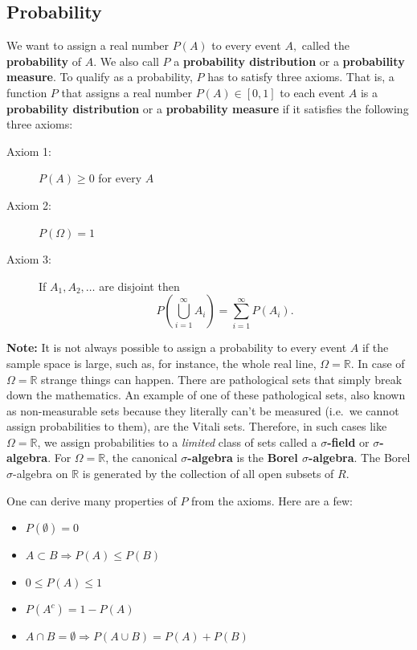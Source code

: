 \documentclass[
  14pt,
]{memoir}
\begin{document}
\hypertarget{probability}{%
\subsection{Probability}\label{probability}}

We want to assign a real number \(P(A)\) to every event \(A,\) called the \textbf{probability} of \(A .\) We also call \(P\) a \textbf{probability distribution} or a \textbf{probability measure}. To qualify as a probability, \(P\) has to satisfy three axioms. That is, a function \(P\) that assigns a real number \(P(A)\in[0,1]\) to each event \(A\) is a \textbf{probability distribution} or a \textbf{probability measure} if it satisfies the following three axioms:
\vspace*{-.25cm}

\begin{description}
\item[Axiom 1:] $P(A) \geq 0$ for every $A$ 
\item[Axiom 2:] $P(\Omega)=1$
\item[Axiom 3:] If $A_{1}, A_{2}, \ldots$ are disjoint then
$$
P\left(\bigcup_{i=1}^{\infty} A_{i}\right)=\sum_{i=1}^{\infty} P\left(A_{i}\right).
$$
\end{description}

\bigskip

\noindent\textbf{Note:} It is not always possible to assign a probability to every event \(A\) if the sample space is large, such as, for instance, the whole real line, \(\Omega=\mathbb{R}\). In case of \(\Omega=\mathbb{R}\) strange things can happen. There are pathological sets that simply break down the mathematics. An example of one of these pathological sets, also known as non-measurable sets because they literally can't be measured (i.e.~we cannot assign probabilities to them), are the Vitali sets. Therefore, in such cases like \(\Omega=\mathbb{R}\), we assign probabilities to a \emph{limited} class of sets called a \textbf{\(\sigma\)-field} or \textbf{\(\sigma\)-algebra}. For \(\Omega=\mathbb{R}\), the canonical \textbf{\(\sigma\)-algebra} is the \textbf{Borel \(\sigma\)-algebra}. The Borel \(\sigma\)-algebra on \(\mathbb{R}\) is generated by the collection of all open subsets of \(R\).

\bigskip

One can derive many properties of \(P\) from the axioms. Here are a few:

\begin{itemize}
\item $P(\emptyset)=0$
\item $A \subset B\Rightarrow P(A) \leq P(B)$
\item $0 \leq P(A) \leq 1$
\item $P\left(A^{c}\right)=1-P(A)$
\item $A \cap B=\emptyset \Rightarrow P(A \cup B)=P(A)+P(B)$
\end{itemize}
\end{document}
